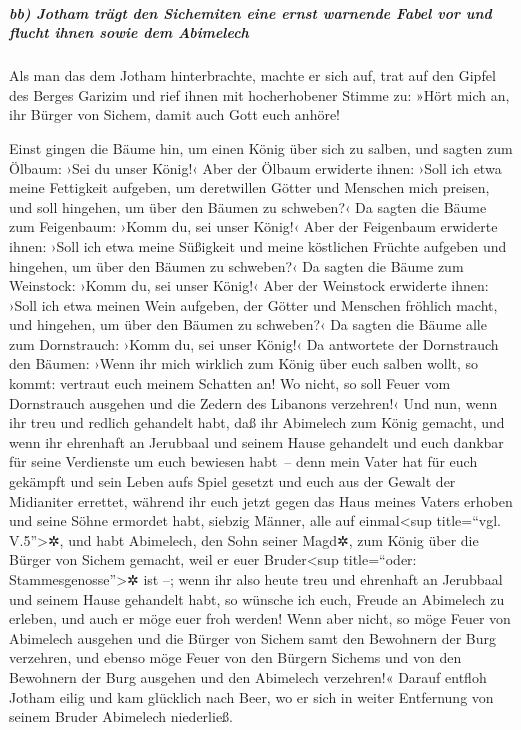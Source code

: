 \hypertarget{bb-jotham-truxe4gt-den-sichemiten-eine-ernst-warnende-fabel-vor-und-flucht-ihnen-sowie-dem-abimelech}{%
\subparagraph{bb) Jotham trägt den Sichemiten eine ernst warnende Fabel
vor und flucht ihnen sowie dem
Abimelech}\label{bb-jotham-truxe4gt-den-sichemiten-eine-ernst-warnende-fabel-vor-und-flucht-ihnen-sowie-dem-abimelech}}

Als man das dem Jotham hinterbrachte, machte er sich auf,
trat auf den Gipfel des Berges Garizim und rief ihnen mit hocherhobener
Stimme zu: »Hört mich an, ihr Bürger von Sichem, damit auch Gott euch
anhöre!

Einst gingen die Bäume hin, um einen König über sich zu
salben, und sagten zum Ölbaum: ›Sei du unser König!‹ Aber
der Ölbaum erwiderte ihnen: ›Soll ich etwa meine Fettigkeit aufgeben, um
deretwillen Götter und Menschen mich preisen, und soll hingehen, um über
den Bäumen zu schweben?‹ Da sagten die Bäume zum
Feigenbaum: ›Komm du, sei unser König!‹ Aber der
Feigenbaum erwiderte ihnen: ›Soll ich etwa meine Süßigkeit und meine
köstlichen Früchte aufgeben und hingehen, um über den Bäumen zu
schweben?‹ Da sagten die Bäume zum Weinstock: ›Komm du,
sei unser König!‹ Aber der Weinstock erwiderte ihnen:
›Soll ich etwa meinen Wein aufgeben, der Götter und Menschen fröhlich
macht, und hingehen, um über den Bäumen zu schweben?‹ Da
sagten die Bäume alle zum Dornstrauch: ›Komm du, sei unser König!‹
Da antwortete der Dornstrauch den Bäumen: ›Wenn ihr mich
wirklich zum König über euch salben wollt, so kommt: vertraut euch
meinem Schatten an! Wo nicht, so soll Feuer vom Dornstrauch ausgehen und
die Zedern des Libanons verzehren!‹ Und nun, wenn ihr
treu und redlich gehandelt habt, daß ihr Abimelech zum König gemacht,
und wenn ihr ehrenhaft an Jerubbaal und seinem Hause gehandelt und euch
dankbar für seine Verdienste um euch bewiesen habt~--
denn mein Vater hat für euch gekämpft und sein Leben aufs
Spiel gesetzt und euch aus der Gewalt der Midianiter errettet,
während ihr euch jetzt gegen das Haus meines Vaters
erhoben und seine Söhne ermordet habt, siebzig Männer, alle auf
einmal\textless sup title=``vgl. V.5''\textgreater✲, und habt Abimelech,
den Sohn seiner Magd✲, zum König über die Bürger von Sichem gemacht,
weil er euer Bruder\textless sup title=``oder:
Stammesgenosse''\textgreater✲ ist --; wenn ihr also heute
treu und ehrenhaft an Jerubbaal und seinem Hause gehandelt habt, so
wünsche ich euch, Freude an Abimelech zu erleben, und auch er möge euer
froh werden! Wenn aber nicht, so möge Feuer von Abimelech
ausgehen und die Bürger von Sichem samt den Bewohnern der Burg
verzehren, und ebenso möge Feuer von den Bürgern Sichems und von den
Bewohnern der Burg ausgehen und den Abimelech verzehren!«
Darauf entfloh Jotham eilig und kam glücklich nach Beer,
wo er sich in weiter Entfernung von seinem Bruder Abimelech niederließ.

